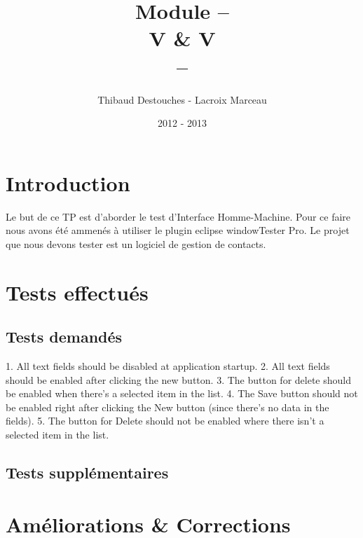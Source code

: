 \documentclass{article}
\title{Module --
\\
V \& V
\\
--}
\author{Thibaud Destouches - Lacroix Marceau}
\date{2012 - 2013}
\begin{document}
\begin{titlepage}
\maketitle
\tableofcontents
\end{titlepage}

\newpage
\section{Introduction}

Le but de ce TP est d’aborder le test d’Interface Homme-Machine. Pour ce faire nous avons été ammenés à utiliser le plugin eclipse windowTester Pro. Le projet que nous devons tester est un logiciel de gestion de contacts.

\section{Tests effectués}

\subsection{Tests demandés}

1. All text fields should be disabled at application startup.
2. All text fields should be enabled after clicking the new button.
3. The button for delete should be enabled when there's a selected item in the list.
4. The Save button should not be enabled right after clicking the New button (since there's no data in the fields). 
5. The button for Delete should not be enabled where there isn't a selected item in the list.

\subsection{Tests supplémentaires}



\section{Améliorations \& Corrections}
\newpage
\end{document}
